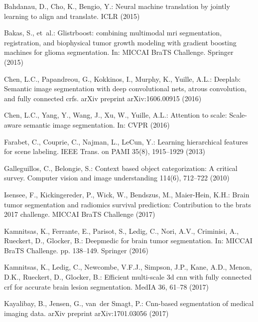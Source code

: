 \documentclass{llncs}
\begin{document}
\vspace{-2mm}

\begin{thebibliography}{10}
\providecommand{\url}[1]{\texttt{#1}}
\providecommand{\urlprefix}{URL }

Bahdanau, D., Cho, K., Bengio, Y.: Neural machine translation by jointly
  learning to align and translate. ICLR  (2015)

Bakas, S., et~al.: Glistrboost: combining multimodal mri segmentation,
  registration, and biophysical tumor growth modeling with gradient boosting
  machines for glioma segmentation. In: MICCAI BraTS Challenge. Springer (2015)

Chen, L.C., Papandreou, G., Kokkinos, I., Murphy, K., Yuille, A.L.: Deeplab:
  Semantic image segmentation with deep convolutional nets, atrous convolution,
  and fully connected crfs. arXiv preprint arXiv:1606.00915  (2016)

Chen, L.C., Yang, Y., Wang, J., Xu, W., Yuille, A.L.: Attention to scale:
  Scale-aware semantic image segmentation. In: CVPR (2016)

Farabet, C., Couprie, C., Najman, L., LeCun, Y.: Learning hierarchical features
  for scene labeling. IEEE Trans. on PAMI  35(8),  1915--1929 (2013)

Galleguillos, C., Belongie, S.: Context based object categorization: A critical
  survey. Computer vision and image understanding  114(6),  712--722 (2010)

Isensee, F., Kickingereder, P., Wick, W., Bendszus, M., Maier-Hein, K.H.: Brain
  tumor segmentation and radiomics survival prediction: Contribution to the
  brats 2017 challenge. MICCAI BraTS Challenge  (2017)

Kamnitsas, K., Ferrante, E., Parisot, S., Ledig, C., Nori, A.V., Criminisi, A.,
  Rueckert, D., Glocker, B.: Deepmedic for brain tumor segmentation. In: MICCAI
  BraTS Challenge. pp. 138--149. Springer (2016)

Kamnitsas, K., Ledig, C., Newcombe, V.F.J., Simpson, J.P., Kane, A.D., Menon,
  D.K., Rueckert, D., Glocker, B.: Efficient multi-scale 3d cnn with fully
  connected crf for accurate brain lesion segmentation. MedIA  36,  61--78
  (2017)

Kayalibay, B., Jensen, G., van~der Smagt, P.: Cnn-based segmentation of medical
  imaging data. arXiv preprint arXiv:1701.03056  (2017)


\end{thebibliography}
\end{document}
